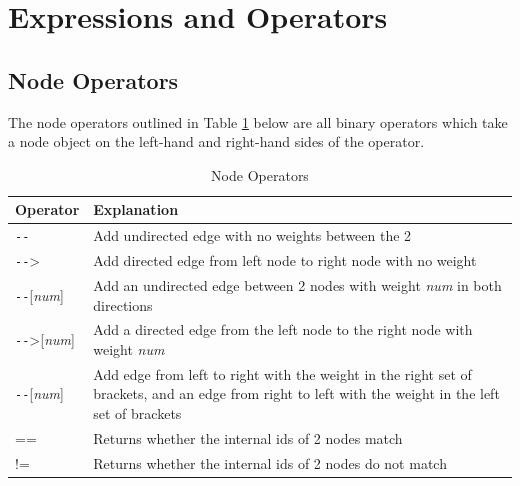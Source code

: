 \documentclass{article}
\begin{document}
\section{Expressions and Operators}

\subsection{Node Operators}

The node operators outlined in Table \ref{tbl:node-ops} below are all binary operators which take a node object on the left-hand and right-hand sides of the operator.

\begin{table}[H]
\centering
\begin{tabular}{| p{1.5in} | p{2.75in} |}
\hline
Operator & Explanation \\
\hline
\texttt{-{}-} & Add undirected edge with no weights between the 2 \\
\hline
\texttt{-{}-}> & Add directed edge from left node to right node with no weight \\
\hline
\texttt{-{}-}[\emph{num}] & Add an undirected edge between 2 nodes with weight \emph{num} in both directions \\
\hline
\texttt{-{}-}>[\emph{num}] & Add a directed edge from the left node to the right node with weight \emph{num} \\
\hline
[\emph{num}]\texttt{-{}-}[\emph{num}] & Add edge from left to right with the weight in the right set of brackets, and an edge from right to left with the weight in the left set of brackets \\
\hline
== & Returns whether the internal ids of 2 nodes match \\
\hline
!= & Returns whether the internal ids of 2 nodes do not match \\
\hline
\end{tabular}
\caption{Node Operators}
\label{tbl:node-ops}
\end{table}
\end{document}
